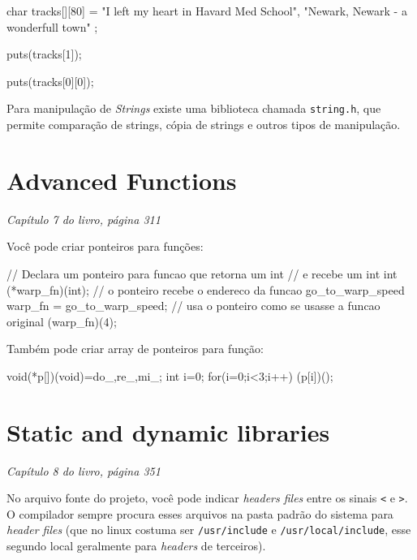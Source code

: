 \documentclass[12pt, a4paper]{article}
\begin{document}
\begin{ccode}
char tracks[][80] = {
    "I left my heart in Havard Med School",
    "Newark, Newark - a wonderfull town"
};

puts(tracks[1]);

puts(tracks[0][0]);
\end{ccode}

Para manipulação de \textit{Strings} existe uma biblioteca chamada \verb|string.h|, que permite comparação de strings, cópia de strings e outros tipos de manipulação.

\section{Advanced Functions}
\begin{flushright}
\textit{Capítulo 7 do livro, página 311}
\end{flushright}

Você pode criar ponteiros para funções:\\

\begin{ccode}
// Declara um ponteiro para funcao que retorna um int
// e recebe um int
int (*warp_fn)(int);
// o ponteiro recebe o endereco da funcao go_to_warp_speed
warp_fn = go_to_warp_speed;
// usa o ponteiro como se usasse a funcao original
(warp_fn)(4);
\end{ccode}

Também pode criar array de ponteiros para função:\\

\begin{ccode}
void(*p[])(void)={do_,re_,mi_};
int i=0;
for(i=0;i<3;i++)
    (p[i])();
\end{ccode}

\section{Static and dynamic libraries}
\begin{flushright}
\textit{Capítulo 8 do livro, página 351}
\end{flushright}

No arquivo fonte do projeto, você pode indicar \textit{headers files} entre os sinais \verb|<| e \verb|>|. O compilador sempre procura esses arquivos na pasta padrão do sistema para \textit{header files} (que no linux costuma ser \verb|/usr/include| e \verb|/usr/local/include|, esse segundo local geralmente para \textit{headers} de terceiros).
\end{document}
